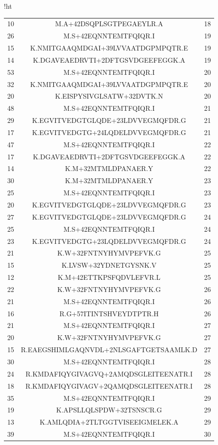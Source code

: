 \documentclass[12pt]{article}
\begin{document}
\begin{table}{!ht}
{\begin{tabular}{ccc}
10&M.A+42DSQPLSGTPEGAEYLR.A&18\\
26&M.S+42EQNNTEMTFQIQR.I&19\\
15&K.NMITGAAQMDGAI+39LVVAATDGPMPQTR.E&19\\
14&K.DGAVEAEDRVTI+2DFTGSVDGEEFEGGK.A&19\\
53&M.S+42EQNNTEMTFQIQR.I&20\\
32&K.NMITGAAQMDGAI+39LVVAATDGPMPQTR.E&20\\
20&K.EISPYSIVGLSATW+32DVTK.N&20\\
48&M.S+42EQNNTEMTFQIQR.I&21\\
29&K.EGVITVEDGTGLQDE+23LDVVEGMQFDR.G&21\\
17&K.EGVITVEDGTG+24LQDELDVVEGMQFDR.G&21\\
47&M.S+42EQNNTEMTFQIQR.I&22\\
17&K.DGAVEAEDRVTI+2DFTGSVDGEEFEGGK.A&22\\
14&K.M+32MTMLDPANAER.Y&22\\
30&K.M+32MTMLDPANAER.Y&23\\
25&M.S+42EQNNTEMTFQIQR.I&23\\
20&K.EGVITVEDGTGLQDE+23LDVVEGMQFDR.G&23\\
27&K.EGVITVEDGTGLQDE+23LDVVEGMQFDR.G&24\\
25&M.S+42EQNNTEMTFQIQR.I&24\\
23&K.EGVITVEDGTG+23LQDELDVVEGMQFDR.G&24\\
21&K.W+32FNTNYHYMVPEFVK.G&25\\
15&K.LVSW+32YDNETGYSNK.V&25\\
12&K.M+42ETTKPSFQDVLEFVR.L&25\\
22&K.W+32FNTNYHYMVPEFVK.G&26\\
21&M.S+42EQNNTEMTFQIQR.I&26\\
16&R.G+57ITINTSHVEYDTPTR.H&26\\
21&M.S+42EQNNTEMTFQIQR.I&27\\
20&K.W+32FNTNYHYMVPEFVK.G&27\\
15&R.EAEGSHIMLGAQNVDL+2NLSGAFTGETSAAMLK.D&27\\
30&M.S+42EQNNTEMTFQIQR.I&28\\
24&R.KMDAFIQYGIVAGVQ+2AMQDSGLEITEENATR.I&28\\
18&R.KMDAFIQYGIVAGV+2QAMQDSGLEITEENATR.I&28\\
35&M.S+42EQNNTEMTFQIQR.I&29\\
19&K.APSLLQLSPDW+32TSNSCR.G&29\\
13&K.AMLQDIA+2TLTGGTVISEEIGMELEK.A&29\\
39&M.S+42EQNNTEMTFQIQR.I&30\\

\end{tabular}}
\end{table}
\end{document}
